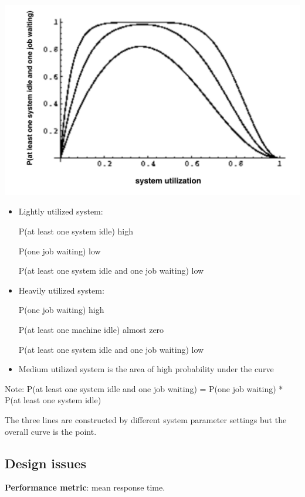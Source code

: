 \documentclass[twoside]{article}
\begin{document}
\begin{center}
  \includegraphics[scale=0.4]{pcurve.png}\\
\end{center} 

\begin{itemize}
\item {Lightly utilized system:  

P(at least one system idle)  high

P(one job waiting)  low

P(at least one system idle and one job waiting)  low} 

 \item {Heavily utilized system: 

P(one job waiting)  high

P(at least one machine idle)  almost zero

P(at least one system idle and one job waiting)  low}  

\item {Medium utilized system is the area of high probability under the curve
}
\end{itemize}

Note: P(at least one system idle and one job waiting) = P(one job waiting) * P(at least one system idle) 

The three lines are constructed by different system parameter settings but the overall curve is the point.

\subsection{Design issues}

{\bf Performance metric}: mean response time.\\
\end{document}
